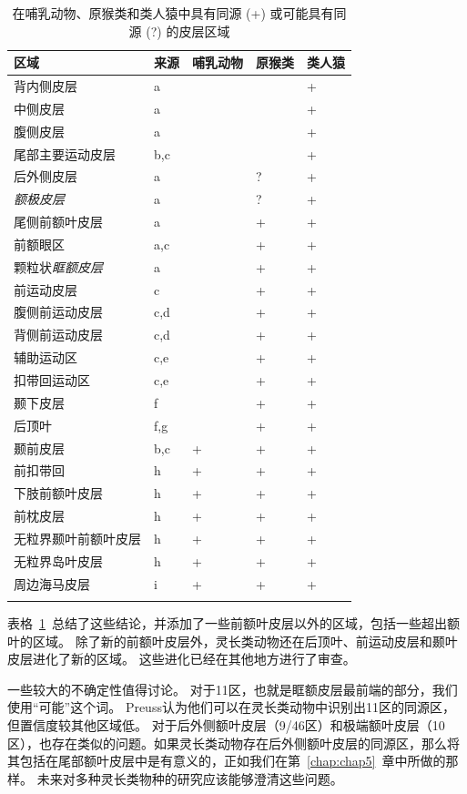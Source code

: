 \begin{table}[htbp]
	\centering
	\caption{在哺乳动物、原猴类和类人猿中具有同源 (+) 或可能具有同源 (?) 的皮层区域}
	\setlength{\tabcolsep}{8mm}	
	\renewcommand\arraystretch{1.5}	
	\begin{tabular}{lllll}
		\toprule
		区域 & 来源 & 哺乳动物 & 原猴类 & 类人猿 \\
		\midrule
		背内侧皮层 & a & & &+  \\
		中侧皮层 & a & & &+  \\
		腹侧皮层 & a & & &+  \\
		尾部主要运动皮层 & b,c & & &+  \\
		后外侧皮层 & a & &? &+  \\
		\textit{额极皮层}&  a & &? &+  \\
		尾侧前额叶皮层&  a & &+ &+  \\
		前额眼区& a,c & &+ &+  \\
		颗粒状\textit{眶额皮层}& a & &+ &+  \\
		前运动皮层& c & &+ &+   \\
		腹侧前运动皮层& c,d & &+ &+  \\
		背侧前运动皮层& c,d & &+ &+  \\
		辅助运动区& c,e & &+ &+  \\
		扣带回运动区& c,e & &+ &+   \\
		颞下皮层& f & &+ &+   \\
		后顶叶 & f,g & &+ &+  \\
		颞前皮层 &  b,c &+ &+ &+  \\
		前扣带回 &  h &+ &+ &+  \\
		下肢前额叶皮层 & h &+ &+ &+  \\
		前枕皮层 & h &+ &+ &+  \\
		无粒界颞叶前额叶皮层 & h &+ &+ &+  \\
		无粒界岛叶皮层 & h &+ &+ &+  \\
		周边海马皮层 & i &+ &+ &+  \\
		\bottomrule
		\label{tab:tab_2_2}
	\end{tabular}%
\end{table}%


表格~\ref{tab:tab_2_2}~总结了这些结论，并添加了一些前额叶皮层以外的区域，包括一些超出额叶的区域。
除了新的前额叶皮层外，灵长类动物还在后顶叶、前运动皮层和颞叶皮层进化了新的区域。
这些进化已经在其他地方进行了审查\cite{kaas2020evolution,preuss2007primate}。


一些较大的不确定性值得讨论。
对于11区，也就是眶额皮层最前端的部分，我们使用“可能”这个词。
Preuss\cite{preuss1991myelo}认为他们可以在灵长类动物中识别出11区的同源区，但置信度较其他区域低。
对于后外侧额叶皮层（9/46区）和极端额叶皮层（10区），也存在类似的问题。如果灵长类动物存在后外侧额叶皮层的同源区，那么将其包括在尾部额叶皮层中是有意义的，正如我们在第~\ref{chap:chap5}~章中所做的那样。
未来对多种灵长类物种的研究应该能够澄清这些问题。


